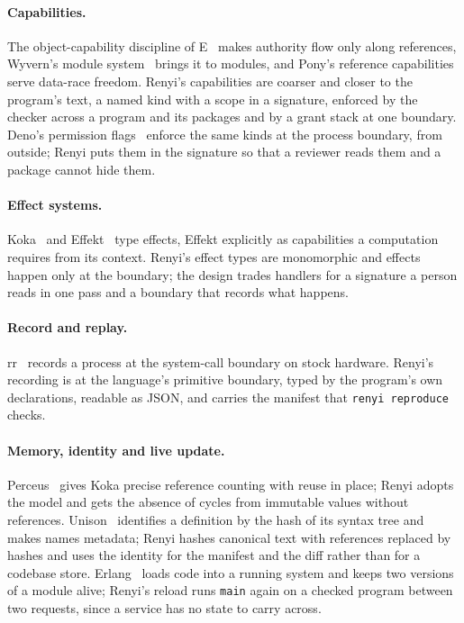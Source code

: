 \documentclass[11pt]{article}
\begin{document}
\paragraph{Capabilities.} The object-capability discipline of
E~\citep{miller2006robust} makes authority flow only along references,
Wyvern's module system~\citep{melicher2017capability} brings it to
modules, and Pony's reference capabilities~\citep{clebsch2015deny}
serve data-race freedom. Renyi's capabilities are coarser and closer to
the program's text, a named kind with a scope in a signature, enforced
by the checker across a program and its packages and by a grant stack
at one boundary. Deno's permission flags~\citep{deno} enforce the same
kinds at the process boundary, from outside; Renyi puts them in the
signature so that a reviewer reads them and a package cannot hide them.

\paragraph{Effect systems.} Koka~\citep{leijen2014koka} and
Effekt~\citep{brachthauser2020effekt} type effects, Effekt explicitly as
capabilities a computation requires from its context. Renyi's effect
types are monomorphic and effects happen only at the boundary; the
design trades handlers for a signature a person reads in one pass and a
boundary that records what happens.

\paragraph{Record and replay.} rr~\citep{ocallahan2017rr} records a
process at the system-call boundary on stock hardware. Renyi's recording
is at the language's primitive boundary, typed by the program's own
declarations, readable as JSON, and carries the manifest that
\texttt{renyi reproduce} checks.

\paragraph{Memory, identity and live update.}
Perceus~\citep{reinking2021perceus} gives Koka precise reference
counting with reuse in place; Renyi adopts the model and gets the
absence of cycles from immutable values without references.
Unison~\citep{unison} identifies a definition by the hash of its syntax
tree and makes names metadata; Renyi hashes canonical text with
references replaced by hashes and uses the identity for the manifest
and the diff rather than for a codebase store.
Erlang~\citep{armstrong2003} loads code into a running system and keeps
two versions of a module alive; Renyi's reload runs \texttt{main} again
on a checked program between two requests, since a service has no state
to carry across.
\end{document}

